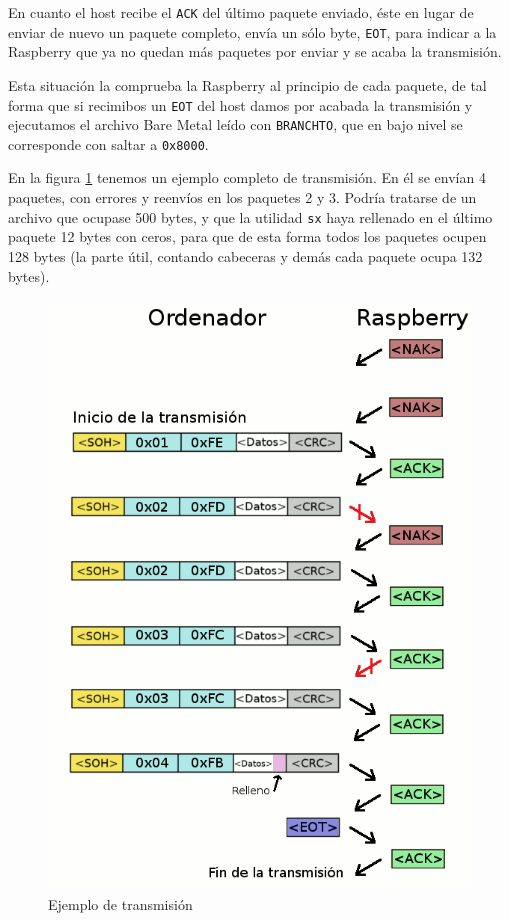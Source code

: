 En cuanto el host recibe el {\tt ACK} del último paquete enviado, éste en lugar de enviar
de nuevo un paquete completo, envía un sólo byte, {\tt EOT}, para indicar a la Raspberry
que ya no quedan más paquetes por enviar y se acaba la transmisión.

Esta situación la comprueba la Raspberry al principio de cada paquete, de tal forma que si
recimibos un {\tt EOT} del host damos por acabada la transmisión y ejecutamos el archivo
Bare Metal leído con {\tt BRANCHTO}, que en bajo nivel se corresponde con saltar a {\tt 0x8000}.

En la figura \ref{fig:transm} tenemos un ejemplo completo de transmisión. En él se envían 4
paquetes, con errores y reenvíos en los paquetes 2 y 3. Podría tratarse de un archivo que
ocupase 500 bytes, y que la utilidad {\tt sx} haya rellenado en el último paquete 12 bytes
con ceros, para que de esta forma todos los paquetes ocupen 128 bytes (la parte útil, contando
cabeceras y demás cada paquete ocupa 132 bytes).

\begin{figure}[h]
  \centering
    \includegraphics[width=14cm]{graphs/transm.png}
  \caption{Ejemplo de transmisión}
  \label{fig:transm}
\end{figure}

\chapterend
